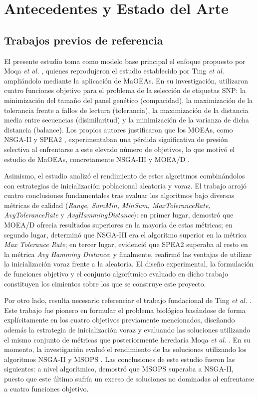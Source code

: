 \chapter{Antecedentes y Estado del Arte}

\section{Trabajos previos de referencia}

El presente estudio toma como modelo base principal el enfoque propuesto por Moqa \textit{et al.} \cite{moqa2022assessing}, quienes reprodujeron el estudio establecido por Ting \textit{et al.} \cite{ting2010multi} ampliándolo mediante la aplicación de MaOEAs. En su investigación, utilizaron cuatro funciones objetivo para el problema de la selección de etiquetas SNP: la minimización del tamaño del panel genético (compacidad), la maximización de la tolerancia frente a fallos de lectura (tolerancia), la maximización de la distancia media entre secuencias (disimilaritud) y la minimización de la varianza de dicha distancia (balance). Los propios autores justificaron que los MOEAs, como NSGA-II \cite{deb2002fast} y SPEA2 \cite{zitzler2001spea2}, experimentaban una pérdida significativa de presión selectiva al enfrentarse a este elevado número de objetivos, lo que motivó el estudio de MaOEAs, concretamente NSGA-III \cite{deb2013evolutionary} y MOEA/D \cite{zhang2007moea}.

Asimismo, el estudio analizó el rendimiento de estos algoritmos combinándolos con estrategias de inicialización poblacional aleatoria y voraz. El trabajo arrojó cuatro conclusiones fundamentales tras evaluar los algoritmos bajo diversas métricas de calidad (\textit{Range, SumMin, MinSum, MaxToleranceRate, AvgToleranceRate} y \textit{AvgHammingDistance}): en primer lugar, demostró que MOEA/D ofrecía resultados superiores en la mayoría de estas métricas; en segundo lugar, determinó que NSGA-III era el algoritmo superior en la métrica \textit{Max Tolerance Rate}; en tercer lugar, evidenció que SPEA2 superaba al resto en la métrica \textit{Avg Hamming Distance}; y finalmente, reafirmó las ventajas de utilizar la inicialización voraz frente a la aleatoria. El diseño experimental, la formulación de funciones objetivo y el conjunto algorítmico evaluado en dicho trabajo constituyen los cimientos sobre los que se construye este proyecto.

Por otro lado, resulta necesario referenciar el trabajo fundacional de Ting \textit{et al.} \cite{ting2010multi}. Este trabajo fue pionero en formular el problema biológico basándose de forma explícitamente en los cuatro objetivos previamente mencionados, diseñando además la estrategia de inicialización voraz y evaluando las soluciones utilizando el mismo conjunto de métricas que posteriormente heredaría Moqa \textit{et al.} \cite{moqa2022assessing}. En su momento, la investigación evaluó el rendimiento de las soluciones utilizando los algoritmos NSGA-II \cite{deb2002fast} y MSOPS \cite{hughes2003msops}. Las conclusiones de este estudio fueron las siguientes: a nivel algorítmico, demostró que MSOPS superaba a NSGA-II, puesto que este último sufría un exceso de soluciones no dominadas al enfrentarse a cuatro funciones objetivo.

